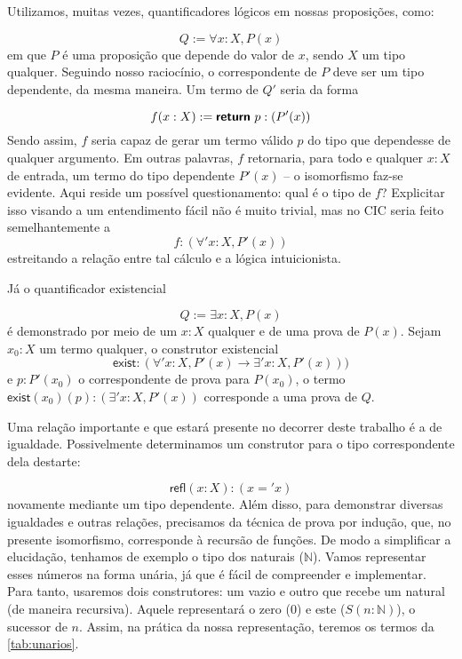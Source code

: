 Utilizamos, muitas vezes, quantificadores lógicos em nossas proposições, como:

$$Q := \forall x:X, P(x)$$ em que $P$ é uma proposição que depende do valor de $x$, sendo $X$ um tipo qualquer. Seguindo nosso raciocínio, o correspondente de $P$ deve ser um tipo dependente, da mesma maneira. Um termo de $Q'$ seria da forma

$$f(x:X) := \textsf{\textbf{return} } p : (P' (x))$$ Sendo assim, $f$ seria capaz de gerar um termo válido $p$ do tipo que dependesse de qualquer argumento. Em outras palavras, $f$ retornaria, para todo e qualquer $x:X$ de entrada, um termo do tipo dependente $P'(x)$ -- o isomorfismo faz-se evidente. Aqui reside um possível questionamento: qual é o tipo de $f$? Explicitar isso visando a um entendimento fácil não é muito trivial, mas no CIC seria feito semelhantemente a $$f:(\forall' x:X, P'(x))$$ estreitando a relação entre tal cálculo e a lógica intuicionista.

Já o quantificador existencial

$$Q := \exists x:X, P(x)$$ é demonstrado por meio de um $x:X$ qualquer e de uma prova de $P(x)$. Sejam $x_0:X$ um termo qualquer, o construtor existencial $$\textsf{exist}:(\forall' x:X, P'(x) \to \exists' x:X, P'(x)))$$ e $p:P'(x_0)$ o correspondente de prova para $P(x_0)$, o termo $\textsf{exist}(x_0)(p):(\exists' x:X, P'(x))$ corresponde a uma prova de $Q$.

Uma relação importante e que estará presente no decorrer deste trabalho é a de igualdade. Possivelmente determinamos um construtor para o tipo correspondente dela destarte:

$$\textsf{refl}(x:X) : (x =' x)$$ novamente mediante um tipo dependente. Além disso, para demonstrar diversas igualdades e outras relações, precisamos da técnica de prova por indução, que, no presente isomorfismo, corresponde à recursão de funções. De modo a simplificar a elucidação, tenhamos de exemplo o tipo dos naturais ($\mathbb{N}$). Vamos representar esses números na forma unária, já que é fácil de compreender e implementar. Para tanto, usaremos dois construtores: um vazio e outro que recebe um natural (de maneira recursiva). Aquele representará o zero ($0$) e este ($S (n:\mathbb{N})$), o sucessor de $n$. Assim, na prática da nossa representação, teremos os termos da \autoref{tab:unarios}.


